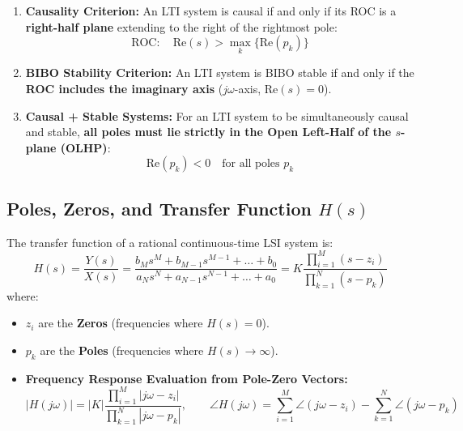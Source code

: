 \documentclass[12pt,a4paper]{article}
\begin{document}
\begin{tcolorbox}[formulabox, title={\textbf{Causality and BIBO Stability Criteria in the \texorpdfstring{$s$}{s}-Plane}}]
\begin{enumerate}[topsep=2pt, itemsep=3pt]
  \item \textbf{Causality Criterion:} An LTI system is causal if and only if its ROC is a \textbf{right-half plane} extending to the right of the rightmost pole:
  \begin{equation}
    \text{ROC}: \quad \text{Re}(s) > \max_k\{\text{Re}(p_k)\}
  \end{equation}
  \item \textbf{BIBO Stability Criterion:} An LTI system is BIBO stable if and only if the \textbf{ROC includes the imaginary axis} ($j\omega$-axis, $\text{Re}(s) = 0$).
  \item \textbf{Causal + Stable Systems:} For an LTI system to be simultaneously causal and stable, \textbf{all poles must lie strictly in the Open Left-Half of the $s$-plane (OLHP)}:
  \begin{equation}
    \text{Re}(p_k) < 0 \quad \text{for all poles } p_k
  \end{equation}
\end{enumerate}
\end{tcolorbox}

\subsection{Poles, Zeros, and Transfer Function $H(s)$}
The transfer function of a rational continuous-time LSI system is:
\begin{equation}
  H(s) = \frac{Y(s)}{X(s)} = \frac{b_M s^M + b_{M-1} s^{M-1} + \dots + b_0}{a_N s^N + a_{N-1} s^{N-1} + \dots + a_0} = K \frac{\prod_{i=1}^M (s - z_i)}{\prod_{k=1}^N (s - p_k)}
\end{equation}
where:
\begin{itemize}[topsep=2pt, itemsep=2pt]
  \item $z_i$ are the \textbf{Zeros} (frequencies where $H(s) = 0$).
  \item $p_k$ are the \textbf{Poles} (frequencies where $H(s) \to \infty$).
  \item \textbf{Frequency Response Evaluation from Pole-Zero Vectors:}
  \begin{equation}
    |H(j\omega)| = |K| \frac{\prod_{i=1}^M |j\omega - z_i|}{\prod_{k=1}^N |j\omega - p_k|}, \qquad \angle H(j\omega) = \sum_{i=1}^M \angle(j\omega - z_i) - \sum_{k=1}^N \angle(j\omega - p_k)
  \end{equation}
\end{itemize}
\end{document}
